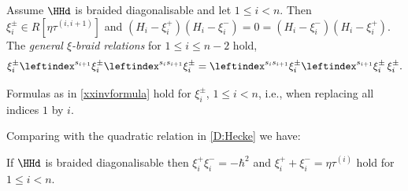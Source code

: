 \documentclass[a4paper,11pt]{amsart}
\numberwithin{equation}{subsection}
\theoremstyle{definition}
\theoremstyle{theorem}
\theoremstyle{remark}
\newcommand\taui[1][i]{\tau^{(#1)}}
\begin{document}
 \begin{Proposition}\label{P:Hieigenvalues}
   Assume $\HHd$ is braided diagonalisable and let $1\le i<n$. Then $\xi_{i}^\pm\in R[\eta\taui[i,i+1]]$ and
   $(H_i-\xi_{i}^{+})(H_i-\xi_{i}^{-})=0=(H_i-\xi_{i}^{-})(H_i-\xi_{i}^{+})$.  The \emph{general $\xi$-braid relations}  for $1\leq i\le n-2$ hold,
    \begin{equation}\label{genxibraid}
    \xi_i^\pm\leftindex^{s_{i+1}}{{\xi_i^\pm}}\leftindex^{s_is_{i+1}}{{\xi_i^\pm}}
    =\leftindex^{s_is_{i+1}}{{\xi_i^\pm}}\leftindex^{s_{i+1}}{{\xi_i^\pm}}\,\xi_i^\pm.
    \end{equation}
 \end{Proposition}
\begin{Corollary}\label{xxxinvformulas} Formulas as in \autoref{xxinvformula} hold for $\xi_i^\pm$, $1\le i<n$, i.e., when replacing all indices $1$ by $i$.
\end{Corollary}
 Comparing with the quadratic relation in \autoref{D:Hecke} we have:
 \begin{Corollary}\label{C:xii}
    If $\HHd$ is braided diagonalisable then $\xi^+_i\xi^-_i=-\hbar^2$ and
  $\xi^+_i+\xi^-_i=\eta\taui$ hold for $1\le i<n$.
 \end{Corollary}
\end{document}
